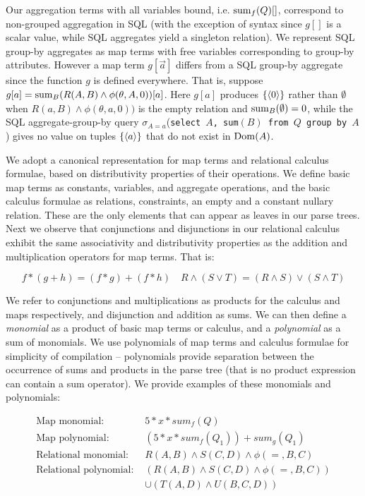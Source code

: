 Our aggregation terms with all variables bound, i.e. $\mathrm{sum}_{f}(Q)[]$,
correspond to non-grouped aggregation in SQL (with the exception of syntax since
$g[]$ is a scalar value, while SQL aggregates yield a singleton relation).  We
represent SQL group-by aggregates as map terms with free variables corresponding
to group-by attributes. However a map term $g[\vec{a}]$
differs from a SQL group-by aggregate since the function $g$ is defined everywhere.
That is, suppose $g[a] = \mathrm{sum}_{B}(R(A,B) \wedge \phi(\theta,A,0))[a]$. Here $g[a]$
produces $\{{\langle0\rangle}\}$ rather than $\emptyset$ when
$R(a,B) \wedge \phi(\theta,a,0))$ is the empty relation and
$\mathrm{sum}_{B}(\emptyset) = 0$, while the SQL aggregate-group-by query
$\sigma_{A=a}$(\texttt{select $A$, sum$(B)$ from $Q$ group by $A$})
gives no value on tuples $\{{\langle a\rangle}\}$ that do not exist in $\mathrm{Dom}(A)$.


We adopt a canonical representation for map terms and relational calculus
formulae, based on distributivity properties of their operations. We define
basic map terms as constants, variables, and aggregate operations, and the basic
calculus formulae as relations, constraints, an empty and a constant
nullary relation. These are the only elements that can appear as leaves in our
parse trees. Next we observe that conjunctions and disjunctions in our relational
calculus exhibit the same associativity and distributivity properties as the
addition and multiplication operators for map terms. That is:

\vspace{-3mm}
\[
f*(g+h) = (f*g) + (f*h)
\quad
R \wedge(S \vee T) = (R \wedge S) \vee (S \wedge T)
\]


We refer to conjunctions and multiplications as products for the calculus and
maps respectively, and disjunction and addition as sums.  We can then define a
\textit{monomial} as a product of basic map terms or calculus, and a
\textit{polynomial} as a sum of monomials. We use polynomials of map terms and
calculus formulae for simplicity of compilation -- polynomials provide
separation between the occurrence of sums and products in the parse tree (that
is no product expression can contain a sum operator).  We provide examples of
these monomials and polynomials:

\vspace{-3mm}
\begin{align*}
\mbox{Map monomial: } &
5*x*sum_{f}(Q)\\
\mbox{Map polynomial: } &
(5*x*sum_{f}(Q_1)) + sum_g(Q_1)\\
\mbox{Relational monomial: } &
R(A,B) \wedge S(C,D) \wedge \phi(=,B,C)\\
\mbox{Relational polynomial: } &
(R(A,B) \wedge S(C,D) \wedge \phi(=,B,C)) \\
& \cup (T(A,D) \wedge U(B,C,D))
\end{align*}


